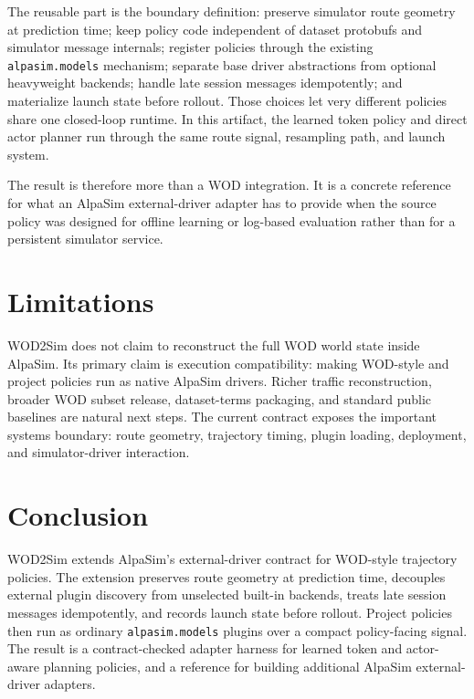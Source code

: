 \documentclass{article}
\begin{document}
The reusable part is the boundary definition: preserve simulator route geometry at
prediction time; keep policy code independent of dataset protobufs and simulator message
internals; register policies through the existing \texttt{alpasim.models} mechanism;
separate base driver abstractions from optional heavyweight backends; handle late session
messages idempotently; and materialize launch state before rollout. Those choices let
very different policies share one closed-loop runtime. In this artifact, the learned
token policy and direct actor planner run through the same route
signal, resampling path, and launch system.

The result is therefore more than a WOD integration. It is a concrete reference for what
an AlpaSim external-driver adapter has to provide when the source policy was designed for
offline learning or log-based evaluation rather than for a persistent simulator service.

\section{Limitations}

WOD2Sim does not claim to reconstruct the full WOD world state inside AlpaSim. Its
primary claim is execution compatibility: making WOD-style and project policies run as
native AlpaSim drivers. Richer traffic reconstruction, broader WOD subset release,
dataset-terms packaging, and standard public baselines are natural next steps. The
current contract exposes the important systems boundary: route geometry, trajectory
timing, plugin loading, deployment, and simulator-driver interaction.

\section{Conclusion}

WOD2Sim extends AlpaSim's external-driver contract for WOD-style trajectory policies.
The extension preserves route geometry at prediction time, decouples external plugin
discovery from unselected built-in backends, treats late session messages idempotently,
and records launch state before rollout. Project policies then run as ordinary
\texttt{alpasim.models} plugins over a compact policy-facing signal. The result is a
contract-checked adapter harness for learned token and actor-aware planning policies,
and a reference for building additional AlpaSim external-driver adapters.


\end{document}
